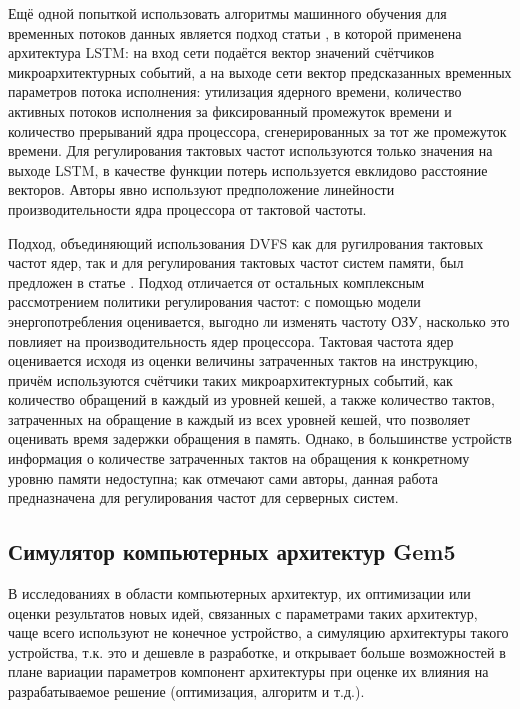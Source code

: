     Ещё одной попыткой использовать алгоритмы машинного обучения для временных потоков данных
    является подход статьи \cite{thethi2023power}, в которой применена архитектура LSTM:
    на вход сети подаётся вектор значений счётчиков микроархитектурных событий, а на выходе
    сети вектор предсказанных временных параметров потока исполнения: утилизация ядерного времени,
    количество активных потоков исполнения за фиксированный промежуток времени и количество прерываний
    ядра процессора, сгенерированных за тот же промежуток времени. Для регулирования тактовых частот
    используются только значения на выходе LSTM, в качестве функции потерь используется евклидово
    расстояние векторов. Авторы явно используют предположение линейности производительности ядра
    процессора от тактовой частоты.

    Подход, объединяющий использования DVFS как для ругилрования тактовых частот ядер, так и для
    регулирования тактовых частот систем памяти, был предложен в статье \cite{deng2012coscale}.
    Подход отличается от остальных комплексным рассмотрением политики регулирования частот:
    с помощью модели энергопотребления оценивается, выгодно ли изменять частоту ОЗУ, насколько это
    повлияет на производительность ядер процессора. Тактовая частота ядер оценивается исходя из
    оценки величины затраченных тактов на инструкцию, причём используются счётчики таких
    микроархитектурных событий, как количество обращений в каждый из уровней кешей, а также
    количество тактов, затраченных на обращение в каждый из всех уровней кешей, что позволяет
    оценивать время задержки обращения в память. Однако, в большинстве устройств информация о
    количестве затраченных тактов на обращения к конкретному уровню памяти недоступна;
    как отмечают сами авторы, данная работа предназначена для регулирования частот для серверных
    систем.

\subsection{Симулятор компьютерных архитектур Gem5}

    В исследованиях в области компьютерных архитектур, их оптимизации или оценки результатов новых идей,
    связанных с параметрами таких архитектур, чаще всего используют не конечное устройство, а симуляцию
    архитектуры такого устройства, т.к. это и дешевле в разработке,
    и открывает больше возможностей в плане вариации параметров компонент архитектуры при оценке
    их влияния на разрабатываемое решение (оптимизация, алгоритм и т.д.).


